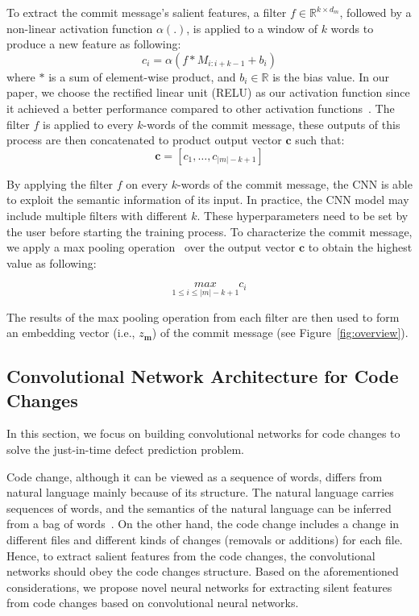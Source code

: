 To extract the commit message's salient features, a filter $f \in \mathbb{R}^{k \times {d_m}}$, followed by a non-linear activation function $\alpha (.)$, is applied to a window of $k$ words to produce a new feature as following:
\begin{equation}
\label{eq:filter_msg}
    c_i = \alpha(f * M_{i:i+k-1} + b_i)
\end{equation}
where $*$ is a sum of element-wise product, and $b_i \in \mathbb{R}$ is the bias value. In our paper, we choose the rectified linear unit (RELU) as our activation function since it achieved a better performance compared to other activation functions~\cite{nair2010rectified, dahl2013improving, he2016deep}. The filter $f$ is applied to every $k$-words of the commit message, these outputs of this process are then concatenated to product output vector $\textbf{c}$ such that:
\begin{equation}
\label{eq:output_ftr_msg}
\textbf{c} = [c_1, \dots, c_{|m| - k + 1}]
\end{equation}

By applying the filter $f$ on every $k$-words of the commit message, the CNN is able to exploit the semantic information of its input. In practice, the CNN model may include multiple filters with different $k$. These hyperparameters need to be set by the user before starting the training process. To characterize the commit message, we apply a max pooling operation~\cite{lecun2015deep} over the output vector $\textbf{c}$ to obtain the highest value as following: 

\begin{equation}
\label{eq:max_pooling_msg}
\underset{1 \leq i \leq |m| - k + 1}{max} c_i
\end{equation}

The results of the max pooling operation from each filter are then used to form an embedding vector (i.e., $z_\textbf{m}$) of the commit message (see Figure~\ref{fig:overview}). 

\subsection{Convolutional Network Architecture for Code Changes}
\label{sec:cnn_code}
In this section, we focus on building convolutional networks for code changes to solve the just-in-time defect prediction problem. 

Code change, although it can be viewed as a sequence of words, differs from natural language mainly because of its structure. The natural language carries sequences of words, and the semantics of the natural language can be inferred from a bag of words~\cite{ng1997corpus}. On the other hand, the code change includes a change in different files and different kinds of changes (removals or additions) for each file. Hence, to extract salient features from the code changes, the convolutional networks should obey the code changes structure. 
Based on the aforementioned considerations, we propose novel neural networks for extracting silent features from code changes based on convolutional neural networks. 

